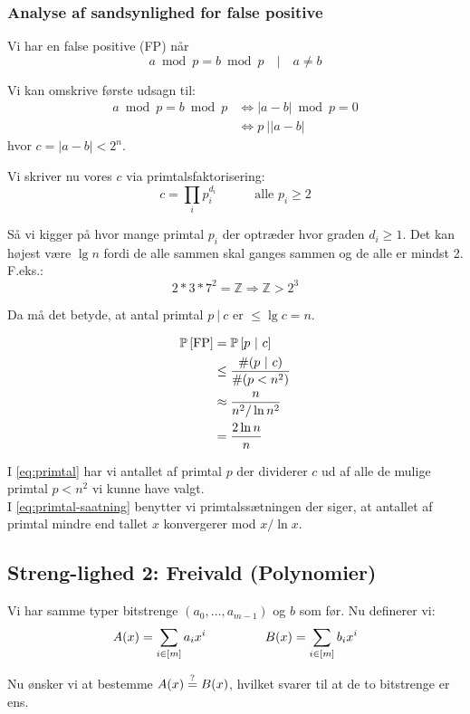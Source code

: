 \subsubsection{Analyse af sandsynlighed for false positive}
Vi har en false positive (FP) når
$$
  a \bmod p = b \bmod p \quad | \quad a \neq b
$$

Vi kan omskrive første udsagn til:
\begin{align}
  a \bmod p = b \bmod p
  &\Longleftrightarrow |a - b| \bmod p = 0\\
  &\Longleftrightarrow p \ \big| |a - b|
\end{align}
hvor $c = |a - b| < 2^n$.


Vi skriver nu vores $c$ via primtalsfaktorisering:
$$
  c = \prod_i p_i^{d_i} \quad\quad\quad \text{alle $p_i \geq 2$}
$$

Så vi kigger på hvor mange primtal $p_i$ der optræder hvor graden $d_i \geq 1$. Det kan højest være $\lg n$ fordi de alle sammen skal ganges sammen og de alle er mindst 2. F.eks.:
$$
  2 * 3 * 7^2 = \mathbb Z \Longrightarrow \mathbb Z > 2^3
$$

Da må det betyde, at antal primtal $p \ | \ c$ er $\leq \lg c = n$.

\begin{align}
  \P{\text{FP}}
  &= \P{ p \ | \ c} \nonumber \\
  &\leq \frac{\# (p \ | \ c)}{\# (p < n^2)} \label{eq:primtal} \\
  &\approx \frac{n}{n^2 / \ln n^2} \label{eq:primtal-saatning} \\
  &= \frac{2 \ln n}{n} \nonumber
\end{align}

I \cref{eq:primtal} har vi antallet af primtal $p$ der dividerer $c$ ud af alle de mulige primtal $p < n^2$  vi kunne have valgt.\\
I \cref{eq:primtal-saatning} benytter vi primtalssætningen der siger, at antallet af primtal mindre end tallet $x$ konvergerer mod $x / \ln x$.


\subsection{Streng-lighed 2: Freivald (Polynomier)}
Vi har samme typer bitstrenge $(a_0, \dots, a_{m-1})$ og $b$ som før. Nu definerer vi:
$$
  A(x) = \sum_{i \in [m]} a_i x^i
  \longspace
  B(x) = \sum_{i \in [m]} b_i x^i
$$

Nu ønsker vi at bestemme $A(x) \? B(x)$, hvilket svarer til at de to bitstrenge er ens.


